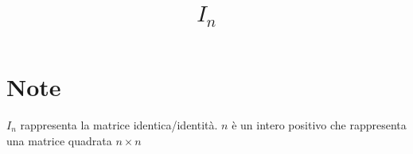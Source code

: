 \documentclass[a4paper,10pt]{article}
\title{$I_{n}$}
\author{}
\begin{document}
\maketitle

\begin{abstract}

\end{abstract}

\section{Note}
$I_{n}$ rappresenta la matrice identica/identità. $n$ è un intero positivo che rappresenta una matrice quadrata $n \times n$
\end{document}
